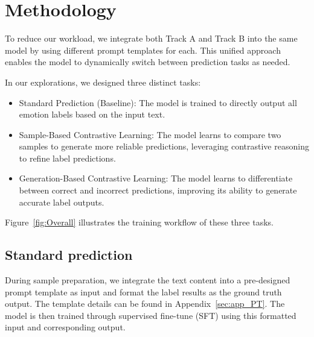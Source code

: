 \documentclass[11pt]{article}
\begin{document}
\section{Methodology}


To reduce our workload, we integrate both Track A and Track B into the same model by using different prompt templates for each. This unified approach enables the model to dynamically switch between prediction tasks as needed. 

In our explorations, we designed three distinct tasks:
\begin{itemize}
	\item Standard Prediction (Baseline): The model is trained to directly output all emotion labels based on the input text.
	\item Sample-Based Contrastive Learning: The model learns to compare two samples to generate more reliable predictions, leveraging contrastive reasoning to refine label predictions.
	\item Generation-Based Contrastive Learning: The model learns to differentiate between correct and incorrect predictions, improving its ability to generate accurate label outputs.
\end{itemize}

Figure~\ref{fig:Overall} illustrates the training workflow of these three tasks.

\subsection{Standard prediction}
\label{sec:SP}

During sample preparation, we integrate the text content into a pre-designed prompt template as input and format the label results as the ground truth output. The template details can be found in Appendix~\ref{sec:app_PT}. The model is then trained through supervised fine-tune (SFT) using this formatted input and corresponding output.
\end{document}
